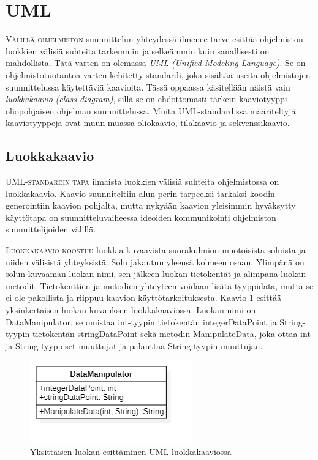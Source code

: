 \documentclass[openany]{book}
\newcommand{\newthought}[1]{\smallskip\textsc{#1}}
\newcommand{\eng}[1]{\textit{(#1)}}
\newcommand{\new}[1]{\textit{\gls{#1}}}
\newcommand{\neweng}[2]{\new{#1} \eng{#2}}
\begin{document}

\section{UML}
\label{paskaa}

\newthought{Välillä ohjelmiston} suunnittelun yhteydessä ilmenee tarve esittää ohjelmiston
luokkien välisiä suhteita tarkemmin ja selkeämmin kuin sanallisesti on mahdollista. Tätä varten on
olemassa \neweng{UML}{Unified Modeling Language}. Se on ohjelmistotuotantoa varten kehitetty
standardi, joka sisältää useita ohjelmistojen suunnittelussa käytettäviä kaavioita. Tässä oppaassa
käsitellään näistä vain \neweng{luokkakaavio}{class diagram}, sillä se on ehdottomasti tärkein
kaaviotyyppi oliopohjaisen ohjelman suunnittelussa. Muita UML-standardissa määriteltyjä
kaaviotyyppejä ovat muun muassa oliokaavio, tilakaavio ja sekvenssikaavio.

\subsection{Luokkakaavio}
\label{luokkakaavio}

\newthought{\gls{UML}-standardin tapa} ilmaista luokkien välisiä suhteita ohjelmistossa on
\gls{luokkakaavio}. Kaavio suunniteltiin alun perin tarpeeksi tarkaksi koodin generointiin kaavion
pohjalta, mutta nykyään kaavion yleisimmin hyväksytty käyttötapa on suunnitteluvaiheessa ideoiden
kommunikointi ohjelmiston suunnittelijoiden välillä.

\newthought{Luokkakaavio koostuu} luokkia kuvaavista suorakulmion muotoisista soluista ja niiden
välisistä yhteyksistä. Solu jakautuu yleensä kolmeen osaan. Ylimpänä on solun kuvaaman luokan
nimi, sen jälkeen luokan tietokentät ja alimpana luokan metodit. Tietokenttien ja metodien
yhteyteen voidaan lisätä tyyppidata, mutta se ei ole pakollista ja riippuu kaavion
käyttötarkoituksesta. Kaavio \ref{luokkakaavioluokka} esittää yksinkertaisen luokan kuvauksen
luokkakaaviossa. Luokan nimi on DataManipulator, se omistaa int-tyypin tietokentän
integerDataPoint ja String-tyypin tietokentän stringDataPoint sekä metodin ManipulateData, joka
ottaa int- ja String-tyyppiset muuttujat ja palauttaa String-tyypin muuttujan.

\begin{figure}
    \includegraphics{ClassDiagramExample1}
    \caption{Yksittäisen luokan esittäminen UML-luokkakaaviossa}
    \label{luokkakaavioluokka}
\end{figure}
\end{document}
